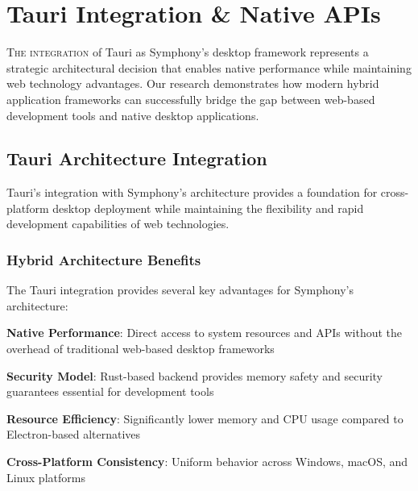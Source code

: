 
\section*{Tauri Integration \& Native APIs}

\lettrine{T}{he integration} of Tauri as Symphony's desktop framework represents a strategic architectural decision that enables native performance while maintaining web technology advantages. Our research demonstrates how modern hybrid application frameworks can successfully bridge the gap between web-based development tools and native desktop applications.

\subsection*{Tauri Architecture Integration}

Tauri's integration with Symphony's architecture provides a foundation for cross-platform desktop deployment while maintaining the flexibility and rapid development capabilities of web technologies.

\subsubsection*{Hybrid Architecture Benefits}

The Tauri integration provides several key advantages for Symphony's architecture:

\begin{expandedlist}
    \item \textbf{Native Performance}: Direct access to system resources and APIs without the overhead of traditional web-based desktop frameworks
    \item \textbf{Security Model}: Rust-based backend provides memory safety and security guarantees essential for development tools
    \item \textbf{Resource Efficiency}: Significantly lower memory and CPU usage compared to Electron-based alternatives
    \item \textbf{Cross-Platform Consistency}: Uniform behavior across Windows, macOS, and Linux platforms
\end{expandedlist}

